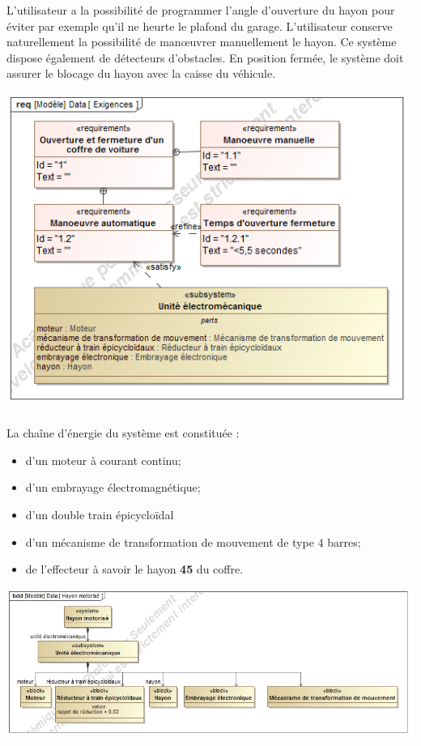 \documentclass[11pt,oneside]{article}
\begin{document}
\begin{minipage}[c]{.4\linewidth}
L’utilisateur a la possibilité de programmer l’angle d’ouverture du hayon pour
éviter par exemple qu’il ne heurte le plafond du garage. L’utilisateur conserve
naturellement la possibilité de man\oe{}uvrer manuellement le hayon. Ce système
dispose également de détecteurs d’obstacles.
En position fermée, le système doit assurer le blocage du hayon avec la caisse
du véhicule.
\end{minipage}\hfill
\begin{minipage}[c]{.59\linewidth}
\begin{center}
\includegraphics[width=.95\textwidth]{png/SysML/Req}
\end{center}

\end{minipage}


La chaîne d'énergie du système est constituée :
\begin{itemize}
\item d'un moteur à courant continu;
\item d'un embrayage électromagnétique;
\item d'un double train épicycloïdal
\item d'un mécanisme de transformation de mouvement de type 4 barres;
\item de l'effecteur à savoir le hayon \textbf{45} du coffre.
\end{itemize}

\begin{center}
\includegraphics[width=.95\textwidth]{png/SysML/BDD}
\end{center}
\end{document}
